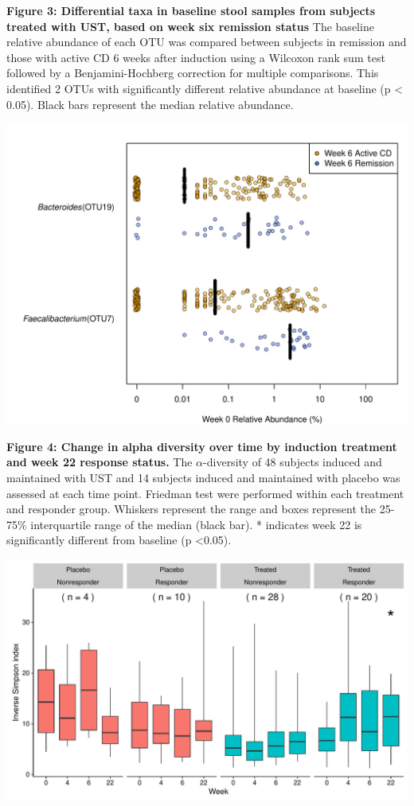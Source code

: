 \documentclass[12pt,]{article}
\begin{document}
\newpage

\textbf{Figure 3: Differential taxa in baseline stool samples from
subjects treated with UST, based on week six remission status} The
baseline relative abundance of each OTU was compared between subjects in
remission and those with active CD 6 weeks after induction using a
Wilcoxon rank sum test followed by a Benjamini-Hochberg correction for
multiple comparisons. This identified 2 OTUs with significantly
different relative abundance at baseline (p \textless{} 0.05). Black
bars represent the median relative abundance.

\includegraphics{figures/Figure3_basesigOTUabund.REMISSwk6.pdf}

\newpage

\textbf{Figure 4: Change in alpha diversity over time by induction
treatment and week 22 response status.} The \({\alpha}\)-diversity of 48
subjects induced and maintained with UST and 14 subjects induced and
maintained with placebo was assessed at each time point. Friedman test
were performed within each treatment and responder group. Whiskers
represent the range and boxes represent the 25-75\% interquartile range
of the median (black bar). * indicates week 22 is significantly
different from baseline (p \textless{}0.05).

\includegraphics{figures/Figure4_alltp.adivXvisitXindtrtXrelRSPwk22.pdf}
\end{document}
